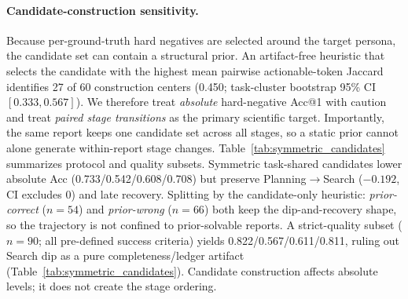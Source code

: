 \documentclass[]{article}
\begin{document}
\paragraph{Candidate-construction sensitivity.}
Because per-ground-truth hard negatives are selected around the target
persona, the candidate set can contain a structural prior. An artifact-free
heuristic that selects the candidate with the highest mean pairwise
actionable-token Jaccard identifies 27 of 60 construction centers
(0.450; task-cluster bootstrap 95\% CI $[0.333,0.567]$).
We therefore treat \emph{absolute} hard-negative Acc@1 with caution and treat
\emph{paired stage transitions} as the primary scientific target.
Importantly, the same report keeps one candidate set across all stages, so a
static prior cannot alone generate within-report stage changes.
Table~\ref{tab:symmetric_candidates} summarizes protocol and quality subsets.
Symmetric task-shared candidates lower absolute Acc (0.733/0.542/0.608/0.708)
but preserve Planning$\to$Search ($-0.192$, CI excludes 0) and late recovery.
Splitting by the candidate-only heuristic: \emph{prior-correct} ($n{=}54$) and
\emph{prior-wrong} ($n{=}66$) both keep the dip-and-recovery shape, so the
trajectory is not confined to prior-solvable reports.
A strict-quality subset ($n{=}90$; all pre-defined success criteria) yields
0.822/0.567/0.611/0.811, ruling out Search dip as a pure completeness/ledger
artifact (Table~\ref{tab:symmetric_candidates}).
Candidate construction affects absolute levels; it does not create the stage
ordering.

\begin{table}[t]
\centering
\small
\setlength{\tabcolsep}{2.8pt}
\caption{Stage Acc@1 under candidate protocols, candidate-only-prior splits,
  and quality-exclusion policies. Dip-and-recovery holds in every row.}
\label{tab:symmetric_candidates}
\end{table}
\end{document}
